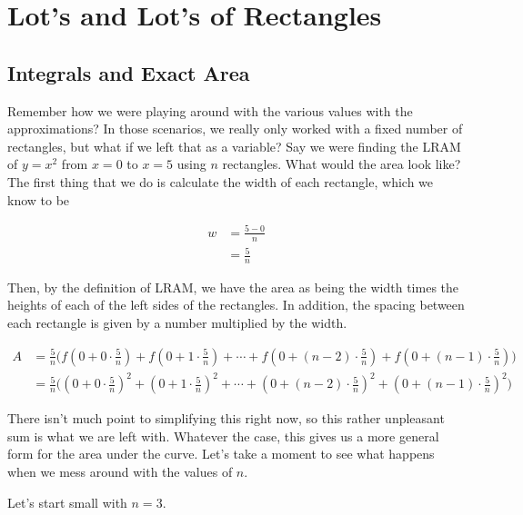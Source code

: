 \section{Lot's and Lot's of Rectangles}

\subsection{Integrals and Exact Area}

Remember how we were playing around with the various values with the approximations? In those scenarios, we really only worked with a fixed number of rectangles, but what if we left that as a variable? Say we were finding the LRAM of \( y = x^2 \) from \( x = 0 \) to \( x = 5 \) using \( n \) rectangles. What would the area look like? The first thing that we do is calculate the width of each rectangle, which we know to be

\begin{align*}
    w &= \frac{5 - 0}{n} \\
      &= \frac{5}{n}
\end{align*}

Then, by the definition of LRAM, we have the area as being the width times the heights of each of the left sides of the rectangles. In addition, the spacing between each rectangle is given by a number multiplied by the width.

\begin{align*}
    A &= \frac{5}{n} \Biggl( f \left( 0 + 0 \cdot \frac{5}{n} \right) + f \left( 0 + 1 \cdot \frac{5}{n} \right) + \cdots + f \left( 0 + \left( n - 2 \right) \cdot \frac{5}{n} \right) +f \left( 0 + \left( n - 1 \right) \cdot \frac{5}{n} \right) \Biggr) \\
    &= \frac{5}{n} \Biggl( \left( 0 + 0 \cdot \frac{5}{n} \right)^2 + \left( 0 + 1 \cdot \frac{5}{n} \right)^2 + \cdots + \left( 0 + \left( n - 2 \right) \cdot \frac{5}{n} \right)^2 + \left( 0 + \left( n - 1 \right) \cdot \frac{5}{n} \right)^2 \Biggr)
\end{align*}

There isn't much point to simplifying this right now, so this rather unpleasant sum is what we are left with. Whatever the case, this gives us a more general form for the area under the curve. Let's take a moment to see what happens when we mess around with the values of \( n \).

Let's start small with \( n = 3 \).

\begin{figure}[H]
    \centering
    
\end{figure}

